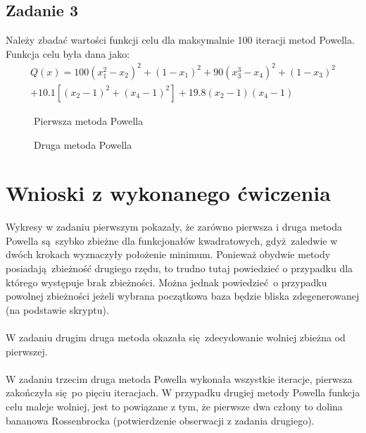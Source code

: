 \documentclass[a4paper, 12pt]{article}
\begin{document}
		\subsection{Zadanie 3}
			Należy zbadać wartości funkcji celu dla maksymalnie 100 iteracji metod Powella. Funkcja celu była dana jako:
			$$
				\begin{aligned}
					Q(x) = 100(x_1^2-x_2) ^ 2 + (1 - x_1)^2 + 90 (x_3^3 - x_4)^2
					+ (1 - x_3)^2 \\
					+ 10.1 [(x_2 - 1)^2 + (x_4-1)^2] + 19.8 (x_2-1)(x_4-1)
				\end{aligned}
			$$
			\begin{figure}[H]
				\centering
				\def \svgwidth{0.7\columnwidth}
				
				\caption{Pierwsza metoda Powella}
			\end{figure}\noindent
			\begin{figure}[H]
				\centering
				\def \svgwidth{0.7\columnwidth}
				
				\caption{Druga metoda Powella}
			\end{figure}\noindent
	\section{Wnioski z wykonanego ćwiczenia}
		Wykresy w zadaniu pierwszym pokazały, że zarówno pierwsza i druga metoda Powella są szybko zbieżne dla funkcjonałów kwadratowych, gdyż zaledwie w dwóch krokach wyznaczyły położenie minimum. Ponieważ obydwie metody posiadają zbieżność drugiego rzędu, to trudno tutaj powiedzieć o przypadku dla którego występuje brak zbieżności. Można jednak powiedzieć o przypadku powolnej zbieżności jeżeli wybrana początkowa baza będzie bliska zdegenerowanej (na podstawie skryptu).
		\\ \\
		W zadaniu drugim druga metoda okazała się zdecydowanie wolniej zbieżna od pierwszej. 
		\\ \\
		W zadaniu trzecim druga metoda Powella wykonała wszystkie iteracje, pierwsza zakończyła się po pięciu iteracjach. W przypadku drugiej metody Powella funkcja celu maleje wolniej, jest to powiązane z tym, że pierwsze dwa człony to dolina bananowa Rossenbrocka (potwierdzenie obserwacji z zadania drugiego).
\end{document}

